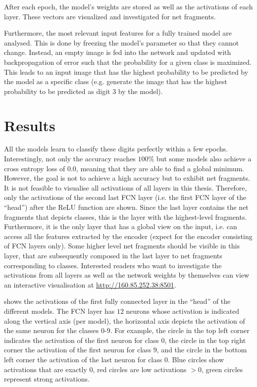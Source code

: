 After each epoch, the model's weights are stored as well as the activations of each layer.
These vectors are visualized and investigated for net fragments.

Furthermore, the most relevant input features for a fully trained model are analysed.
This is done by freezing the model's parameter so that they cannot change.
Instead, an empty image is fed into the network and updated with backpropagation of error such that the probability for a given class is maximized.
This leads to an input image that has the highest probability to be predicted by the model as a specific class (e.g. generate the image that has the highest probability to be predicted as digit $3$ by the model).


\section{Results}
All the models learn to classify these digits perfectly within a few epochs.
Interestingly, not only the accuracy reaches $100\%$ but some models also achieve a cross entropy loss of $0.0$, meaning that they are able to find a global minimum.
However, the goal is not to achieve a high accuracy but to exhibit net fragments.
It is not feasible to visualise all activations of all layers in this thesis.
Therefore, only the activations of the second last FCN layer (i.e. the first FCN layer of the ``head'') after the ReLU function are shown.
Since the last layer contains the net fragments that depicts classes, this is the layer with the highest-level fragments.
Furthermore, it is the only layer that has a global view on the input, i.e. can access all the features extracted by the encoder (expect for the encoder consisting of FCN layers only).
Some higher level net fragments should be visible in this layer, that are subsequently composed in the last layer to net fragments corresponding to classes.
Interested readers who want to investigate the activations from all layers as well as the network weights by themselves can view an interactive visualisation at \url{http://160.85.252.38:8501}.

 shows the activations of the first fully connected layer in the ``head'' of the different models.
The FCN layer has $12$ neurons whose activation is indicated along the vertical axis (per model), the horizontal axis depicts the activation of the same neuron for the classes $0$-$9$.
For example, the circle in the top left corner indicates the activation of the first neuron for class $0$, the circle in the top right corner the activation of the first neuron for class $9$, and the circle in the bottom left corner the activation of the last neuron for class $0$.
Blue circles show activations that are exactly $0$, red circles are low activations $>0$, green circles represent strong activations.

